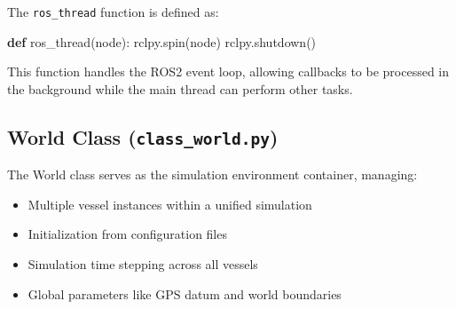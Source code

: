 \documentclass[
  letterpaper,
  DIV=11,
  numbers=noendperiod]{scrreprt}
\newenvironment{Shaded}{\begin{snugshade}}{\end{snugshade}}
\newcommand{\KeywordTok}[1]{\textcolor[rgb]{0.00,0.23,0.31}{\textbf{#1}}}
\newcommand{\NormalTok}[1]{\textcolor[rgb]{0.00,0.23,0.31}{#1}}
\providecommand{\tightlist}{%
  \setlength{\itemsep}{0pt}\setlength{\parskip}{0pt}}\usepackage{longtable,booktabs,array}
\begin{document}
The \texttt{ros\_thread} function is defined as:

\begin{Shaded}
\begin{Highlighting}[]
\KeywordTok{def}\NormalTok{ ros\_thread(node):}
\NormalTok{    rclpy.spin(node)}
\NormalTok{    rclpy.shutdown()}
\end{Highlighting}
\end{Shaded}

This function handles the ROS2 event loop, allowing callbacks to be
processed in the background while the main thread can perform other
tasks.

\subsection*{\texorpdfstring{World Class
(\texttt{class\_world.py})}{World Class (class\_world.py)}}\label{world-class-class_world.py}

The World class serves as the simulation environment container,
managing:

\begin{itemize}
\tightlist
\item
  Multiple vessel instances within a unified simulation
\item
  Initialization from configuration files
\item
  Simulation time stepping across all vessels
\item
  Global parameters like GPS datum and world boundaries
\end{itemize}
\end{document}
